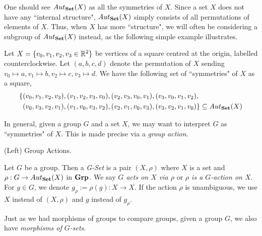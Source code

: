 \documentclass[../../book.tex]{subfiles}
\begin{document}
\begin{rmk}

    One should see $Aut_{\mathbf{Set}}(X)$ as all the symmetries of $X$. 
    Since a set $X$ does not have any ``internal structure", 
    $Aut_{\mathbf{Set}}(X)$ simply consists of all permutations of elements of $X$. 
    Thus, when $X$ has more ``structure", 
    we will often be considering a subgroup of $Aut_{\mathbf{Set}}(X)$ instead, 
    as the following simple example illustrates. 
    
\end{rmk}

\begin{eg}
    Let $X = \{v_0, v_1, v_2, v_3 \in \mathbb{R}^2\}$ be 
    vertices of a square centred at the origin, labelled counterclockwise. 
    Let $(a, b, c, d)$ denote the permutation of $X$ sending
    $v_0 \mapsto a, v_1 \mapsto b, v_2 \mapsto c, v_3 \mapsto d$. 
    We have the following set of ``symmetries" of $X$ as a square, 
    \begin{align*}
        \{
            &(v_0, v_1, v_2, v_3), (v_1, v_2, v_3, v_0), 
            (v_2, v_3, v_0, v_1), (v_3, v_0, v_1, v_2), \\
            &(v_0, v_3, v_2, v_1), (v_1, v_0, v_3, v_2), 
            (v_2, v_1, v_0, v_3), (v_3, v_2, v_1, v_0)
        \} \subseteq Aut_{\mathbf{Set}}(X)
    \end{align*}
    
\end{eg}

\begin{rmk}
    In general, given a group $G$ and a set $X$, 
    we may want to interpret $G$ as ``symmetries" of $X$. 
    This is made precise via a \emph{group action}. 
\end{rmk}

\begin{dfn} (Left) Group Actions. 

    Let $G$ be a group. 
    Then a \emph{G-Set} is a pair $(X, \rho)$ where 
    $X$ is a set and $\rho : G \to Aut_{\mathbf{Set}}(X)$ in $\mathbf{Grp}$.
    We say \emph{$G$ acts on $X$ via $\rho$} or 
    \emph{$\rho$ is a $G$-action on $X$}. 
    For $g \in G$, we denote $g_\rho := \rho(g) : X \to X$. 
    If the action $\rho$ is unambiguous, we use $X$ instead of $(X,\rho)$
    and $g$ instead of $g_\rho$.
    
\end{dfn}

Just as we had morphisms of groups to compare groups, 
given a group $G$, we also have \emph{morphisms of $G$-sets}. 
\end{document}
